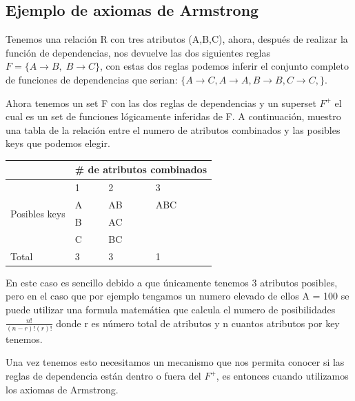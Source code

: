 \documentclass{cosas/tfg_domingo}
\begin{document}
\subsection{Ejemplo de axiomas de Armstrong}
Tenemos una relación R con tres atributos (A,B,C), ahora, después de realizar la función de dependencias, nos devuelve las dos siguientes reglas $F = \{A \rightarrow B , \; B \rightarrow C\}$, con estas dos reglas podemos inferir el conjunto completo de funciones de dependencias que serian: $\{ A \rightarrow C , A \rightarrow A , B \rightarrow B , C \rightarrow C ,\}$.

Ahora tenemos un set F con las dos reglas de dependencias y un superset $F^+$ el cual es un set de funciones lógicamente inferidas de F. A continuación, muestro una tabla de la relación entre el numero de atributos combinados y las posibles keys que podemos elegir.

\begin{table}[h]
\begin{tabular}{|l|l|l|l|}
\hline
                               & \multicolumn{3}{l|}{\# de atributos combinados} \\ \hline
\multirow{4}{*}{Posibles keys} & 1              & 2               & 3                \\ \cline{2-4} 
                               & A              & AB              & ABC              \\ \cline{2-4} 
                               & B              & AC              &                  \\ \cline{2-4} 
                               & C              & BC              &                  \\ \hline
Total                          & 3              & 3               & 1                \\ \hline
\end{tabular}
\end{table}

En este caso es sencillo debido a que únicamente tenemos 3 atributos posibles, pero en el caso que por ejemplo tengamos un numero elevado de ellos A = 100 se puede utilizar una formula matemática que calcula el numero de posibilidades $\frac{n!}{(n-r)! (r)!}$ donde r es número total de atributos y n cuantos atributos por key tenemos.

Una vez tenemos esto necesitamos un mecanismo que nos permita conocer si las reglas de dependencia están dentro o fuera del $F^+$, es entonces cuando utilizamos los axiomas de Armstrong.
\end{document}

